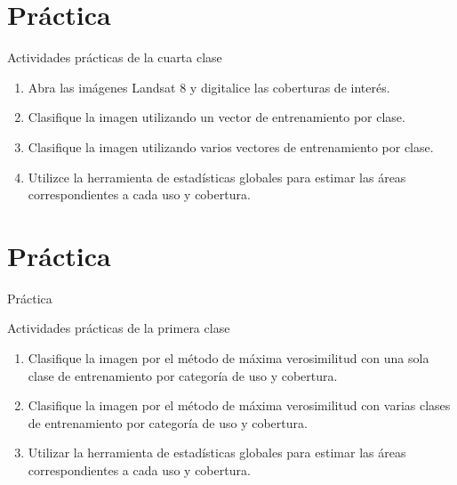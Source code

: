 \documentclass[]{beamer}
\begin{document}
\section{Práctica}

\begin{frame}{\secname}
  \begin{exampleblock}{Actividades prácticas de la cuarta clase}
    \begin{enumerate}[<+>]
      \item Abra las imágenes Landsat 8 y digitalice las coberturas de interés.
      \item Clasifique la imagen utilizando un vector de entrenamiento por clase.
      \item Clasifique la imagen utilizando varios vectores de entrenamiento por clase.
      \item Utilizce la herramienta de estadísticas globales para estimar las áreas correspondientes a cada uso y cobertura.
    \end{enumerate}
  \end{exampleblock}
\end{frame}
\section{Práctica}

\begin{frame}{Práctica}
  \begin{exampleblock}{Actividades prácticas de la primera clase}
    \begin{enumerate}
      \item Clasifique la imagen por el método de máxima verosimilitud con una sola clase de entrenamiento por categoría de uso y cobertura.
      \item Clasifique la imagen por el método de máxima verosimilitud con varias clases de entrenamiento por categoría de uso y cobertura.
      \item Utilizar la herramienta de estadísticas globales para estimar las áreas correspondientes a cada uso y cobertura.
    \end{enumerate}
  \end{exampleblock}
\end{frame}
\end{document}
